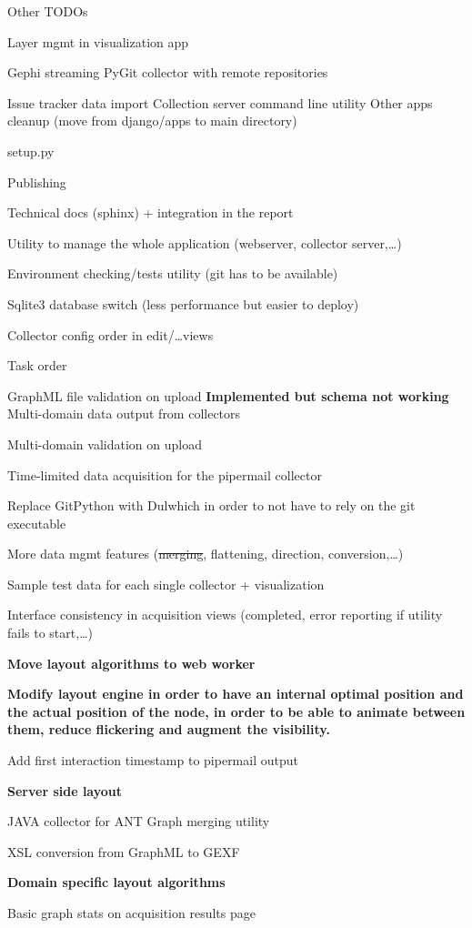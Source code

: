 \begin{todos}{Other TODOs}
    \item Layer mgmt in visualization app
    \item Gephi streaming
    \done PyGit collector with remote repositories
    \item Issue tracker data import
    \done Collection server command line utility
    \done Other apps cleanup (move from django/apps to main directory)
    \item setup.py
    \item Publishing
    \item Technical docs (sphinx) + integration in the report
    \item Utility to manage the whole application (webserver, collector server,\ldots)
    \item Environment checking/tests utility (git has to be available)
    \item Sqlite3 database switch (less performance but easier to deploy)
    \item Collector config order in edit/\ldots views
    \item Task order
    \item GraphML file validation on upload \textbf{Implemented but schema not working}
    \done Multi-domain data output from collectors
    \item Multi-domain validation on upload
    \item Time-limited data acquisition for the pipermail collector
    \item Replace GitPython with Dulwhich in order to not have to rely on the git executable
    \item More data mgmt features (\sout{merging}, flattening, direction, conversion,\ldots)
    \item Sample test data for each single collector + visualization
    \item Interface consistency in acquisition views (completed, error reporting if utility fails to start,\ldots)
    \item \textbf{Move layout algorithms to web worker}
    \item \textbf{Modify layout engine in order to have an internal optimal position and the actual position of the node, in order to be able to animate between them, reduce flickering and augment the visibility.}
    \item Add first interaction timestamp to pipermail output
    \item \textbf{Server side layout}
    \item JAVA collector for ANT
    \done Graph merging utility
    \item XSL conversion from GraphML to GEXF
    \item \textbf{Domain specific layout algorithms}
    \item Basic graph stats on acquisition results page
\end{todos}

